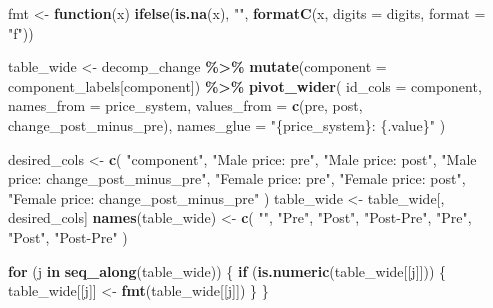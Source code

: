 \documentclass[
]{article}
\newenvironment{Shaded}{\begin{snugshade}}{\end{snugshade}}
\newcommand{\AttributeTok}[1]{\textcolor[rgb]{0.13,0.29,0.53}{#1}}
\newcommand{\ControlFlowTok}[1]{\textcolor[rgb]{0.13,0.29,0.53}{\textbf{#1}}}
\newcommand{\FunctionTok}[1]{\textcolor[rgb]{0.13,0.29,0.53}{\textbf{#1}}}
\newcommand{\NormalTok}[1]{#1}
\newcommand{\OtherTok}[1]{\textcolor[rgb]{0.56,0.35,0.01}{#1}}
\newcommand{\SpecialCharTok}[1]{\textcolor[rgb]{0.81,0.36,0.00}{\textbf{#1}}}
\newcommand{\StringTok}[1]{\textcolor[rgb]{0.31,0.60,0.02}{#1}}
\begin{document}
\begin{Shaded}
\begin{Highlighting}[]
\NormalTok{    fmt }\OtherTok{\textless{}{-}} \ControlFlowTok{function}\NormalTok{(x) }\FunctionTok{ifelse}\NormalTok{(}\FunctionTok{is.na}\NormalTok{(x), }\StringTok{""}\NormalTok{, }\FunctionTok{formatC}\NormalTok{(x, }\AttributeTok{digits =}\NormalTok{ digits, }\AttributeTok{format =} \StringTok{"f"}\NormalTok{))}

\NormalTok{    table\_wide }\OtherTok{\textless{}{-}}\NormalTok{ decomp\_change }\SpecialCharTok{\%\textgreater{}\%}
        \FunctionTok{mutate}\NormalTok{(}\AttributeTok{component =}\NormalTok{ component\_labels[component]) }\SpecialCharTok{\%\textgreater{}\%}
        \FunctionTok{pivot\_wider}\NormalTok{(}
            \AttributeTok{id\_cols =}\NormalTok{ component,}
            \AttributeTok{names\_from =}\NormalTok{ price\_system,}
            \AttributeTok{values\_from =} \FunctionTok{c}\NormalTok{(pre, post, change\_post\_minus\_pre),}
            \AttributeTok{names\_glue =} \StringTok{"\{price\_system\}: \{.value\}"}
\NormalTok{        )}

\NormalTok{    desired\_cols }\OtherTok{\textless{}{-}} \FunctionTok{c}\NormalTok{(}
        \StringTok{"component"}\NormalTok{,}
        \StringTok{"Male price: pre"}\NormalTok{,}
        \StringTok{"Male price: post"}\NormalTok{,}
        \StringTok{"Male price: change\_post\_minus\_pre"}\NormalTok{,}
        \StringTok{"Female price: pre"}\NormalTok{,}
        \StringTok{"Female price: post"}\NormalTok{,}
        \StringTok{"Female price: change\_post\_minus\_pre"}
\NormalTok{    )}
\NormalTok{    table\_wide }\OtherTok{\textless{}{-}}\NormalTok{ table\_wide[, desired\_cols]}
    \FunctionTok{names}\NormalTok{(table\_wide) }\OtherTok{\textless{}{-}} \FunctionTok{c}\NormalTok{(}
        \StringTok{""}\NormalTok{,}
        \StringTok{"Pre"}\NormalTok{,}
        \StringTok{"Post"}\NormalTok{,}
        \StringTok{"Post{-}Pre"}\NormalTok{,}
        \StringTok{"Pre"}\NormalTok{,}
        \StringTok{"Post"}\NormalTok{,}
        \StringTok{"Post{-}Pre"}
\NormalTok{    )}

    \ControlFlowTok{for}\NormalTok{ (j }\ControlFlowTok{in} \FunctionTok{seq\_along}\NormalTok{(table\_wide)) \{}
        \ControlFlowTok{if}\NormalTok{ (}\FunctionTok{is.numeric}\NormalTok{(table\_wide[[j]])) \{}
\NormalTok{            table\_wide[[j]] }\OtherTok{\textless{}{-}} \FunctionTok{fmt}\NormalTok{(table\_wide[[j]])}
\NormalTok{        \}}
\NormalTok{    \}}


\end{Highlighting}
\end{Shaded}
\end{document}

